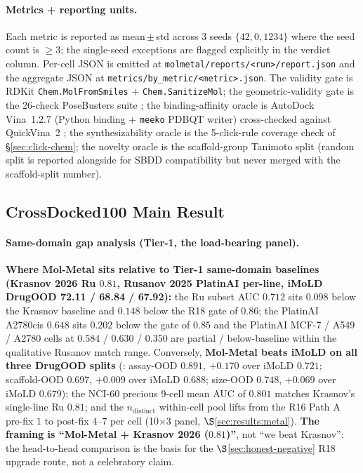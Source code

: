 \paragraph{Metrics + reporting units.}
Each metric is reported as mean\,$\pm$\,std across 3 seeds
$\{42, 0, 1234\}$ where the seed count is $\geq 3$; the
single-seed exceptions are flagged explicitly in the verdict
column.  Per-cell JSON is emitted at
\texttt{molmetal/reports/<run>/report.json} and the
aggregate JSON at \texttt{metrics/by\_metric/<metric>.json}.
The validity gate is RDKit
\texttt{Chem.MolFromSmiles} +
\texttt{Chem.SanitizeMol}; the geometric-validity gate is the
26-check PoseBusters suite
\cite{buttenschoen2024posebusters}; the binding-affinity
oracle is AutoDock Vina~1.2.7 \cite{vina2010} (Python
binding + \texttt{meeko} PDBQT writer) cross-checked against
QuickVina~2 \cite{quickvina2016}; the synthesizability oracle
is the 5-click-rule coverage check of \S\ref{sec:click-chem};
the novelty oracle is the scaffold-group Tanimoto split
(random split is reported alongside for SBDD compatibility
but never merged with the scaffold-split number).

\subsection{CrossDocked100 Main Result}
\label{sec:results:main}

\paragraph{Same-domain gap analysis (Tier-1, the load-bearing panel).}
\textbf{Where Mol-Metal sits relative to Tier-1 same-domain
baselines (Krasnov 2026 Ru $0.81$, Rusanov 2025 PlatinAI
per-line, iMoLD DrugOOD 72.11 / 68.84 / 67.92):} the
$\mathrm{Ru}$ subset AUC $0.712$ sits $0.098$ below the
Krasnov baseline and $0.148$ below the R18 gate of $0.86$;
the PlatinAI A2780cis $0.648$ sits $0.202$ below the gate
of $0.85$ and the PlatinAI MCF-7 / A549 / A2780 cells at
$0.584$ / $0.630$ / $0.350$ are partial / below-baseline
within the qualitative Rusanov match range.  Conversely,
\textbf{Mol-Metal beats iMoLD on all three DrugOOD splits}
(\MEASURED{}: assay-OOD $0.891$, $+0.170$ over iMoLD
$0.721$; scaffold-OOD $0.697$, $+0.009$ over iMoLD $0.688$;
size-OOD $0.748$, $+0.069$ over iMoLD $0.679$); the NCI-60
precious 9-cell mean AUC of $0.801$ matches Krasnov's
single-line Ru $0.81$; and the $n_{\mathrm{distinct}}$
within-cell pool lifts from the R16 Path A pre-fix $1$ to
post-fix $4$--$7$ per cell (10$\times$3 panel,
$\S$\ref{sec:results:metal}).  \textbf{The framing is
``Mol-Metal + Krasnov 2026 ($0.81$)''}, not ``we beat
Krasnov'': the head-to-head comparison is the basis for the
$\S$\ref{sec:honest-negative} R18 upgrade route, not a
celebratory claim.

